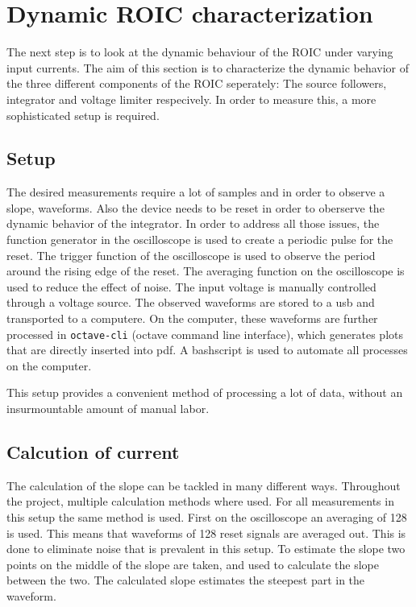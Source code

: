 \section{Dynamic ROIC characterization}\label{sec:dynamic_ROIC_characterization}
The next step is to look at the dynamic behaviour of the ROIC under varying input currents. The aim of this section is to characterize the dynamic behavior of the three different components of the ROIC seperately: The source followers, integrator and voltage limiter respecively. In order to measure this, a more sophisticated setup is required.


\subsection{Setup}\label{ssec:dynamic_setup}
The desired measurements require a lot of samples and in order to observe a slope, waveforms. Also the device needs to be reset in order to oberserve the dynamic behavior of the integrator. In order to address all those issues, the function generator in the oscilloscope is used to create a periodic pulse for the reset. The trigger function of the oscilloscope is used to observe the period around the rising edge of the reset. The averaging function on the oscilloscope is used to reduce the effect of noise. The input voltage is manually controlled through a voltage source. The observed waveforms are stored to a usb and transported to a computere. On the computer, these waveforms are further processed in \texttt{octave-cli} (octave command line interface), which generates plots that are directly inserted into pdf. A bashscript is used to automate all processes on the computer.

This setup provides a convenient method of processing a lot of data, without an insurmountable amount of manual labor.

\subsection{Calcution of current}
The calculation of the slope can be tackled in many different ways. Throughout the project, multiple calculation methods where used. For all measurements in this setup the same method is used. First on the oscilloscope an averaging of 128 is used. This means that waveforms of 128 reset signals are averaged out. This is done to eliminate noise that is prevalent in this setup. To estimate the slope two points on the middle of the slope are taken, and used to calculate the slope between the two. The calculated slope estimates the steepest part in the waveform.

